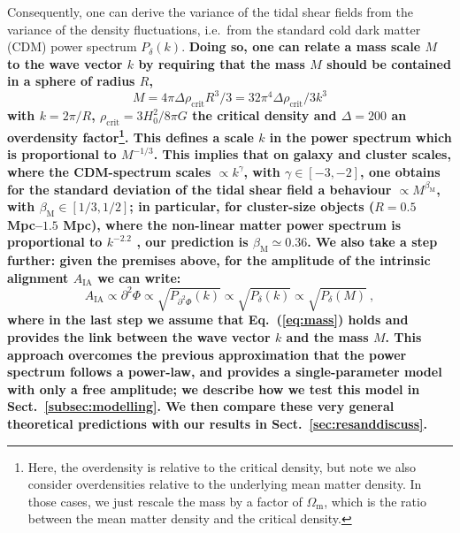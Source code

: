 \documentclass[a4paper,fleqn,usenatbib]{mnras}
\newenvironment{correction}
 {\bfseries}%
  {}%
\begin{document}
Consequently, one can derive the variance of the tidal shear fields from the variance of the density fluctuations, i.e.\ from the standard cold dark matter (CDM) power spectrum $P_\delta(k)$. 
\begin{correction}Doing so, one can relate a mass scale $M$ to the wave vector $k$ by requiring that the mass $M$ should be contained in a sphere of radius $R$, 
\begin{equation}
\label{eq:mass}
M=4\pi \Delta \rho_{\mathrm{crit}}R^3/3 = 32\pi^4 \Delta \rho_{\mathrm{crit}}/3k^3
\end{equation}
with $k=2\pi/R$, $\rho_{\mathrm{crit}} = 3H_0^2/8\pi G$ the critical density and $\Delta=200$ an overdensity factor\footnote{Here, the overdensity is relative to the critical density, but note we also consider overdensities relative to the underlying mean matter density. In those cases, we just rescale the mass by a factor of $\Omega_{\mathrm{m}}$, which is the ratio between the mean matter density and the critical density.}.
\end{correction}
This defines a scale $k$ in the power spectrum which is proportional to $M^{-1/3}$. This implies that on galaxy and cluster scales, where the CDM-spectrum scales $\propto k^{\gamma}$, with $ \gamma \in [ -3,-2 ]$, one obtains for the standard deviation of the tidal shear field a behaviour $\propto M^{\beta_{\mathrm{M}}}$, with $ \beta_{\mathrm{M}} \in [ 1/3, 1/2]$; in particular, for cluster-size objects ($R=0.5$ Mpc--$1.5$ Mpc), where the non-linear matter power spectrum is proportional to $k^{-2.2}$ \citep{Blasetal2011}, our prediction is $\beta_{\mathrm{M}} \simeq 0.36$. 
\begin{correction}
We also take a step further: given the premises above, for the amplitude of the intrinsic alignment $A_{\mathrm{IA}}$ we can write:
\begin{equation}
\label{eq:secapproach}
A_{\mathrm{IA}} \propto \partial^2\Phi \propto \sqrt{P_{\partial^2\Phi}(k)} \propto \sqrt{P_\delta(k)} \propto \sqrt{P_\delta(M)} \ ,
\end{equation}
where in the last step we assume that Eq.~(\ref{eq:mass}) holds and provides the link between the wave vector $k$ and the mass $M$. This approach overcomes the previous approximation that the power spectrum follows a power-law, and provides a single-parameter model with only a free amplitude; we describe how we test this model in Sect.~\ref{subsec:modelling}.
\end{correction}
We then compare these very general theoretical predictions with our results in Sect.~\ref{sec:resanddiscuss}.
\end{document}
